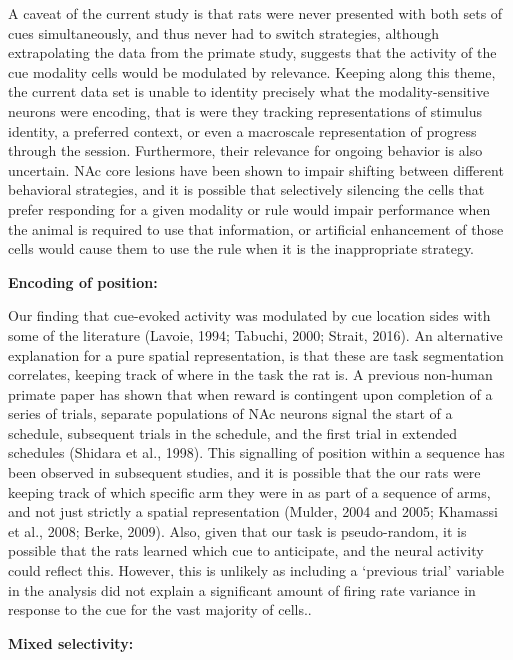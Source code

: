 \documentclass[11pt]{article}
\begin{document}
A caveat of the current study is that rats were never presented with both sets of cues simultaneously, and thus never had to switch strategies, although extrapolating the data from the primate study, suggests that the activity of the cue modality cells would be modulated by relevance. Keeping along this theme, the current data set is unable to identity precisely what the modality-sensitive neurons were encoding, that is were they tracking representations of stimulus identity, a preferred context, or even a macroscale representation of progress through the session. Furthermore, their relevance for ongoing behavior is also uncertain. NAc core lesions have been shown to impair shifting between different behavioral strategies, and it is possible that selectively silencing the cells that prefer responding for a given modality or rule would impair performance when the animal is required to use that information, or artificial enhancement of those cells would cause them to use the rule when it is the inappropriate strategy.

{\bf Encoding of position:} 

Our finding that cue-evoked activity was modulated by cue location sides with some of the literature (Lavoie, 1994; Tabuchi, 2000; Strait, 2016). An alternative explanation for a pure spatial representation, is that these are task segmentation correlates, keeping track of where in the task the rat is. A previous non-human primate paper has shown that when reward is contingent upon completion of a series of trials, separate populations of NAc neurons signal the start of a schedule, subsequent trials in the schedule, and the first trial in extended schedules (Shidara et al., 1998). This signalling of position within a sequence has been observed in subsequent studies, and it is possible that the our rats were keeping track of which specific arm they were in as part of a sequence of arms, and not just strictly a spatial representation (Mulder, 2004 and 2005; Khamassi et al., 2008; Berke, 2009). Also, given that our task is pseudo-random, it is possible that the rats learned which cue to anticipate, and the neural activity could reflect this. However, this is unlikely as including a ‘previous trial’ variable in the analysis did not explain a significant amount of firing rate variance in response to the cue for the vast majority of cells..

{\bf Mixed selectivity:} 
\end{document}
